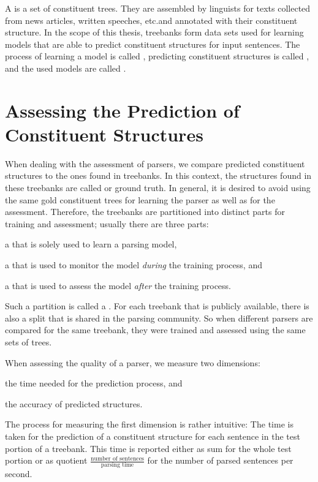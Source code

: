 \documentclass[../document.tex]{subfiles}
\begin{document}
    A  is a set of constituent trees.
    They are assembled by linguists for texts collected from news articles, written speeches, etc.\@ and annotated with their constituent structure.
    In the scope of this thesis, treebanks form data sets used for learning models that are able to predict constituent structures for input sentences.
    The process of learning a model is called , predicting constituent structures is called , and the used models are called .

    \section{Assessing the Prediction of Constituent Structures}
    When dealing with the assessment of parsers, we compare predicted constituent structures to the ones found in treebanks.
    In this context, the structures found in these treebanks are called  or ground truth.
    In general, it is desired to avoid using the same gold constituent trees for learning the parser as well as for the assessment.
    Therefore, the treebanks are partitioned into distinct parts for training and assessment; usually there are three parts:
    \begin{inparaenum}[(i)]
        \item a  that is solely used to learn a parsing model,
        \item a  that is used to monitor the model \emph{during} the training process, and
        \item a  that is used to assess the model \emph{after} the training process.
    \end{inparaenum}
    Such a partition is called a .
    For each treebank that is publicly available, there is also a split that is shared in the parsing community.
    So when different parsers are compared for the same treebank, they were trained and assessed using the same sets of trees.

    When assessing the quality of a parser, we measure two dimensions:
    \begin{inparaenum}[(i)]
        \item the time needed for the prediction process, and
        \item the accuracy of predicted structures.
    \end{inparaenum}
    The process for measuring the first dimension is rather intuitive:
        The time is taken for the prediction of a constituent structure for each sentence in the test portion of a treebank.
    This time is reported either as sum for the whole test portion or as quotient \(\frac{\text{number of sentences}}{\text{parsing time}}\) for the number of parsed sentences per second.
\end{document}
